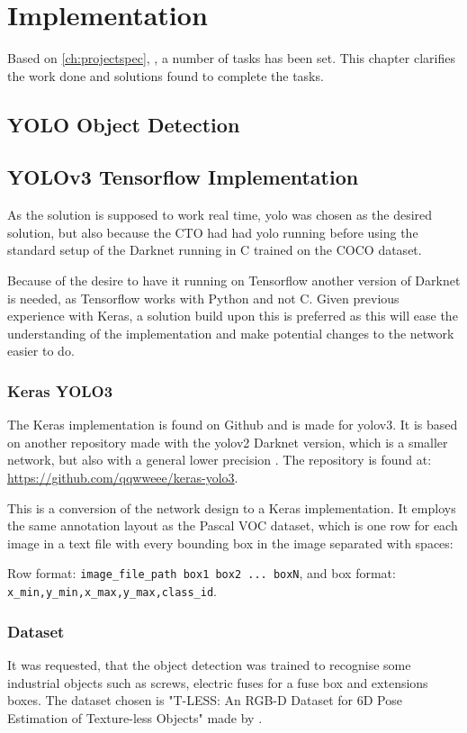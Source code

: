 \chapter{Implementation}\label{ch:implementation}\glsresetall
Based on \autoref{ch:projectspec}, , a number of tasks has been set. This chapter clarifies the work done and solutions found to complete the tasks.

\section{YOLO Object Detection}

\section{YOLOv3 Tensorflow Implementation}
As the solution is supposed to work real time, \gls{yolo} was chosen as the desired solution, but also because the CTO had had \gls{yolo} running before using the standard setup of the Darknet running in C trained on the COCO dataset.

Because of the desire to have it running on Tensorflow another version of Darknet is needed, as Tensorflow works with Python and not C. 
Given previous experience with Keras, a solution build upon this is preferred as this will ease the understanding of the implementation and make potential changes to the network easier to do.

\subsection{Keras YOLO3}\label{sec:kerasyolo}
The Keras implementation is found on Github and is made for \gls{yolo}v3. It is based on another repository made with the \gls{yolo}v2 Darknet version, which is a smaller network, but also with a general lower precision \citep{Redmon2016, Redmon2018}. The repository is found at: \url{https://github.com/qqwweee/keras-yolo3}.

This is a conversion of the network design to a Keras implementation. It employs the same annotation layout as the Pascal VOC dataset, which is one row for each image in a text file with every bounding box in the image separated with spaces:

Row format: \lstinline{image_file_path box1 box2 ... boxN}, and box format: \lstinline{x_min,y_min,x_max,y_max,class_id}.

\subsection{Dataset}
It was requested, that the object detection was trained to recognise some industrial objects such as screws, electric fuses for a fuse box and extensions boxes. The dataset chosen is "T-LESS: An RGB-D Dataset for 6D Pose Estimation of Texture-less Objects" made by \cite{tless}. 

